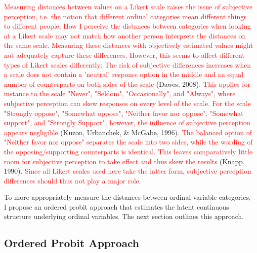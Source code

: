 \documentclass[12pt,econ]{sources/authesis}
\begin{document}
\textcolor{red}{Measuring distances between values on a Likert scale raises the issue of subjective perception, i.e. the notion that different ordinal categories mean different things to different people. How I perceive the distances between categories when looking at a Likert scale may not match how another person interprets the distances on the same scale. Measuring these distances with objectively estimated values might not adequately capture these differences. However, this seems to affect different types of Likert scales differently: The risk of subjective differences increases when a scale does not contain a 'neutral' response option in the middle and an equal number of counterparts on both sides of the scale} (Dawes, 2008)\textcolor{red}{. This applies for instance to the scale "Never", "Seldom", "Occasionally", and "Always", where subjective perception can skew responses on every level of the scale. For the scale "Strongly oppose", "Somewhat oppose", "Neither favor nor oppose", "Somewhat support", and "Strongly Support", however, the influence of subjective perception appears negligible} (Kuzon, Urbanchek, \& McGabe, 1996)\textcolor{red}{. The balanced option of "Neither favor nor oppose" separates the scale into two sides, while the wording of the opposing/supporting counterparts is identical. This leaves comparatively little room for subjective perception to take effect and thus skew the results} (Knapp, 1990)\textcolor{red}{. Since all Likert scales used here take the latter form, subjective perception differences should thus not play a major role.}

To more appropriately measure the distances between ordinal variable categories, I propose an ordered probit approach that estimates the latent continuous structure underlying ordinal variables. The next section outlines this approach.

\hypertarget{ordblock-theory-op}{%
\subsection{Ordered Probit Approach}\label{ordblock-theory-op}}
\end{document}
